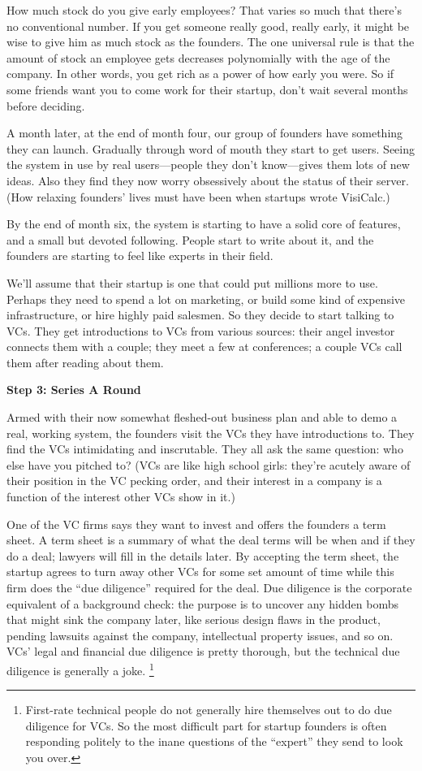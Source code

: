 How much stock do you give early employees? That varies so much that
there's no conventional number. If you get someone really good, really
early, it might be wise to give him as much stock as the founders. The
one universal rule is that the amount of stock an employee gets
decreases polynomially with the age of the company. In other words, you
get rich as a power of how early you were. So if some friends want you
to come work for their startup, don't wait several months before
deciding.

A month later, at the end of month four, our group of founders have
something they can launch. Gradually through word of mouth they start to
get users. Seeing the system in use by real users---people they don't
know---gives them lots of new ideas. Also they find they now worry
obsessively about the status of their server. (How relaxing founders'
lives must have been when startups wrote VisiCalc.)

By the end of month six, the system is starting to have a solid core of
features, and a small but devoted following. People start to write about
it, and the founders are starting to feel like experts in their field.

We'll assume that their startup is one that could put millions more to
use. Perhaps they need to spend a lot on marketing, or build some kind
of expensive infrastructure, or hire highly paid salesmen. So they
decide to start talking to VCs. They get introductions to VCs from
various sources: their angel investor connects them with a couple; they
meet a few at conferences; a couple VCs call them after reading about
them.

\textbf{Step 3: Series A Round}

Armed with their now somewhat fleshed-out business plan and able to demo
a real, working system, the founders visit the VCs they have
introductions to. They find the VCs intimidating and inscrutable. They
all ask the same question: who else have you pitched to? (VCs are like
high school girls: they're acutely aware of their position in the VC
pecking order, and their interest in a company is a function of the
interest other VCs show in it.)

One of the VC firms says they want to invest and offers the founders a
term sheet. A term sheet is a summary of what the deal terms will be
when and if they do a deal; lawyers will fill in the details later. By
accepting the term sheet, the startup agrees to turn away other VCs for
some set amount of time while this firm does the ``due diligence''
required for the deal. Due diligence is the corporate equivalent of a
background check: the purpose is to uncover any hidden bombs that might
sink the company later, like serious design flaws in the product,
pending lawsuits against the company, intellectual property issues, and
so on. VCs' legal and financial due diligence is pretty thorough, but
the technical due diligence is generally a joke. \footnote{First-rate technical people do not generally hire themselves out
to do due diligence for VCs. So the most difficult part for startup
founders is often responding politely to the inane questions of the
``expert'' they send to look you over.}

